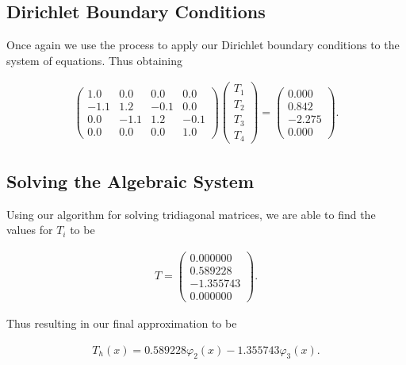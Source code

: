\documentclass[10pt]{amsart}
\numberwithin{equation}{section}
\theoremstyle{definition}
\begin{document}
\begin{multicols}{2}
\subsection{Dirichlet Boundary Conditions}%
\label{sub:dirichlet_boundary_conditions}

Once again we use the process to apply our Dirichlet boundary conditions to the
system of equations. Thus obtaining

\begin{align*}
  \begin{pmatrix}
    1.0 &  0.0 & 0.0 & 0.0 \\
    -1.1 & 1.2 & -0.1 & 0.0 \\
    0.0 & -1.1 & 1.2 & -0.1 \\
    0.0 &  0.0 & 0.0 & 1.0
  \end{pmatrix}
  \begin{pmatrix}
    T_1 \\ T_2 \\ T_3 \\ T_4
  \end{pmatrix}
  =
  \begin{pmatrix}
    0.000 \\ 0.842 \\ -2.275 \\ 0.000
  \end{pmatrix}.
\end{align*}

\subsection{Solving the Algebraic System}%
\label{sub:solving_the_algebraic_system}

Using our algorithm for solving tridiagonal matrices, we are able to find the
values for $T_i$ to be

\begin{align*}
  T=\begin{pmatrix}
    0.000000 \\ 0.589228 \\ -1.355743 \\ 0.000000
  \end{pmatrix}.
\end{align*}

Thus resulting in our final approximation to be

\begin{align*}
  T_h(x) = 0.589228\varphi_2(x)-1.355743\varphi_3(x).
\end{align*}


\end{multicols}
\end{document}
